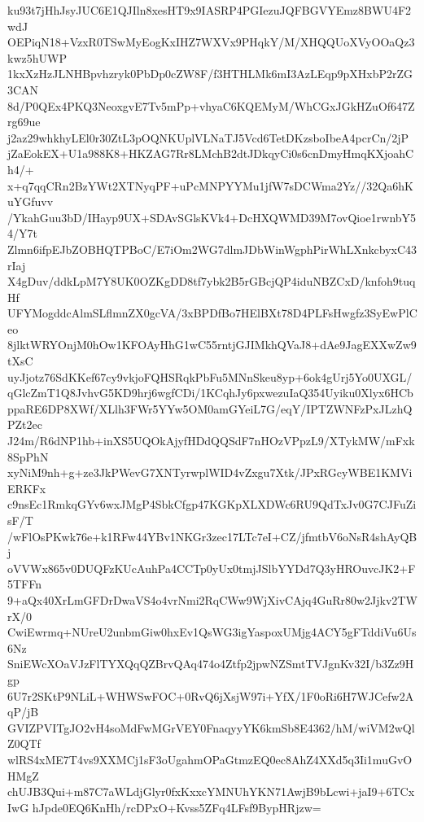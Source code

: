 ku93t7jHhJsyJUC6E1QJIln8xesHT9x9IASRP4PGIezuJQFBGVYEmz8BWU4F2wdJ
OEPiqN18+VzxR0TSwMyEogKxIHZ7WXVx9PHqkY/M/XHQQUoXVyOOaQz3kwz5hUWP
1kxXzHzJLNHBpvhzryk0PbDp0cZW8F/f3HTHLMk6mI3AzLEqp9pXHxbP2rZG3CAN
8d/P0QEx4PKQ3NeoxgvE7Tv5mPp+vhyaC6KQEMyM/WhCGxJGkHZuOf647Zrg69ue
j2az29whkhyLEl0r30ZtL3pOQNKUplVLNaTJ5Vcd6TetDKzsboIbeA4pcrCn/2jP
jZaEokEX+U1a988K8+HKZAG7Rr8LMchB2dtJDkqyCi0s6cnDmyHmqKXjoahCh4/+
x+q7qqCRn2BzYWt2XTNyqPF+uPcMNPYYMu1jfW7sDCWma2Yz//32Qa6hKuYGfuvv
/YkahGuu3bD/IHayp9UX+SDAvSGlsKVk4+DcHXQWMD39M7ovQioe1rwnbY54/Y7t
Zlmn6ifpEJbZOBHQTPBoC/E7iOm2WG7dlmJDbWinWgphPirWhLXnkcbyxC43rIaj
X4gDuv/ddkLpM7Y8UK0OZKgDD8tf7ybk2B5rGBcjQP4iduNBZCxD/knfoh9tuqHf
UFYMogddcAlmSLflmnZX0gcVA/3xBPDfBo7HElBXt78D4PLFsHwgfz3SyEwPlCeo
8jlktWRYOnjM0hOw1KFOAyHhG1wC55rntjGJIMkhQVaJ8+dAe9JagEXXwZw9tXsC
uyJjotz76SdKKef67cy9vkjoFQHSRqkPbFu5MNnSkeu8yp+6ok4gUrj5Yo0UXGL/
qGlcZmT1Q8JvhvG5KD9hrj6wgfCDi/1KCqhJy6pxwezuIaQ354Uyiku0Xlyx6HCb
ppaRE6DP8XWf/XLlh3FWr5YYw5OM0amGYeiL7G/eqY/IPTZWNFzPxJLzhQPZt2ec
J24m/R6dNP1hb+inXS5UQOkAjyfHDdQQSdF7nHOzVPpzL9/XTykMW/mFxk8SpPhN
xyNiM9nh+g+ze3JkPWevG7XNTyrwplWID4vZxgu7Xtk/JPxRGcyWBE1KMViERKFx
c9nsEc1RmkqGYv6wxJMgP4SbkCfgp47KGKpXLXDWc6RU9QdTxJv0G7CJFuZisF/T
/wFlOsPKwk76e+k1RFw44YBv1NKGr3zec17LTc7eI+CZ/jfmtbV6oNsR4shAyQBj
oVVWx865v0DUQFzKUcAuhPa4CCTp0yUx0tmjJSlbYYDd7Q3yHROuvcJK2+F5TFFn
9+aQx40XrLmGFDrDwaVS4o4vrNmi2RqCWw9WjXivCAjq4GuRr80w2Jjkv2TWrX/0
CwiEwrmq+NUreU2unbmGiw0hxEv1QsWG3igYaspoxUMjg4ACY5gFTddiVu6Us6Nz
SniEWcXOaVJzFlTYXQqQZBrvQAq474o4Ztfp2jpwNZSmtTVJgnKv32I/b3Zz9Hgp
6U7r2SKtP9NLiL+WHWSwFOC+0RvQ6jXsjW97i+YfX/1F0oRi6H7WJCefw2AqP/jB
GVIZPVITgJO2vH4soMdFwMGrVEY0FnaqyyYK6kmSb8E4362/hM/wiVM2wQlZ0QTf
wlRS4xME7T4vs9XXMCj1sF3oUgahmOPaGtmzEQ0ec8AhZ4XXd5q3Ii1muGvOHMgZ
chUJB3Qui+m87C7aWLdjGlyr0fxKxxcYMNUhYKN71AwjB9bLcwi+jaI9+6TCxIwG
hJpde0EQ6KnHh/rcDPxO+Kvss5ZFq4LFsf9BypHRjzw=

